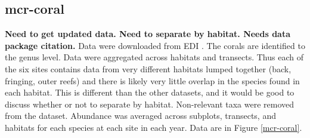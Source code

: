 \documentclass[11pt, oneside]{article}
\begin{document}
\subsection {mcr-coral}
{\bf Need to get updated data. Need to separate by habitat. Needs data package citation.}
Data were downloaded from EDI \citep{mcr-coral}.
The corals are identified to the genus level.
Data were aggregated across habitats and transects.
Thus each of the six sites contains data from very different habitats lumped together (back, fringing, outer reefs) and there is likely very little overlap in the species found in each habitat. 
This is different than the other datasets, and it would be good to discuss whether or not to separate by habitat.
Non-relevant taxa were removed from the dataset.
Abundance was averaged across subplots, transects, and habitats for each species at each site in each year.
Data are in Figure \ref{mcr-coral}.
\end{document}
